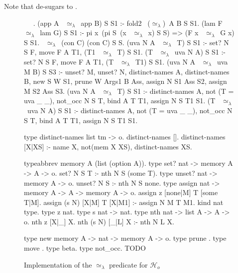 \documentclass[sigconf,natbib=false]{acmart}
\newcommand{\UnifRel}{\ensuremath{\simeq}}
\newcommand{\Ue}{\ensuremath{\UnifRel_\lambda}\xspace}
\newcommand{\Ho}{\ensuremath{\mathcal{H}_o}\xspace}
\begin{document}
Note that  de-sugars to .

\begin{figure*}
\begin{elpicode}
~ \PYG{n+nf}{(\Ue)} ~.
(app A ~\Ue~app B) S S1 :- fold2 ~(\Ue)~A B S S1.
(lam F ~\Ue~lam G) S S1 :- pi x\ (pi S\ (x ~\Ue~x) S S) => (F x ~\Ue~G x) S S1.
~\Ue~(con C) (con C) S S.
(uva N A ~\Ue~T) S S1 :- set? N S F, move F A T1, (T1 ~\Ue~T) S S1.
(T ~\Ue~uva N A) S S1 :- set? N S F, move F A T1, (T ~\Ue~T1) S S1.
(uva N A ~\Ue~uva M B) S S3 :-  unset? M, unset? N,
  distinct-names A, distinct-names B, 
  new S W S1, prune W Args1 B Ass, 
  assign N S1 Ass S2, assign M S2 Ass S3.
(uva N A ~\Ue~T) S S1 :- distinct-names A, not (T = uva _ _), not_occ N S T,  
  bind A T T1, assign N S T1 S1.
(T ~\Ue~uva N A) S S1 :- distinct-names A, not (T = uva _ _), not_occ N S T, 
  bind A T T1, assign N S T1 S1. 
      
type distinct-names list tm -> o.
distinct-names [].
distinct-names [X|XS] :- name X, not(mem X XS),
distinct-names XS.

typeabbrev memory A (list (option A)).
type set? nat -> memory A -> A -> o.
set? N S T :- nth N S (some T).
type unset? nat -> memory A -> o.
unset? N S :- nth N S none.
type assign nat -> memory A -> A -> memory A -> o.
assign z [none|M] T [some T|M].
assign (s N) [X|M] T [X|M1] :- assign N M T M1. 
kind nat type.
type z nat.
type s nat -> nat.
type nth nat -> list A -> A -> o.
nth z [X|_] X.
nth (s N) [_|L] X :- nth N L X.

type new memory A -> nat -> memory A -> o.
type prune .
type move .
type beta.
type not_occ.
TODO

\end{elpicode}
\caption{Implementation of the \Ue predicate for \Ho}
\label{code:ue-pred}
\end{figure*}
  
\end{document}
